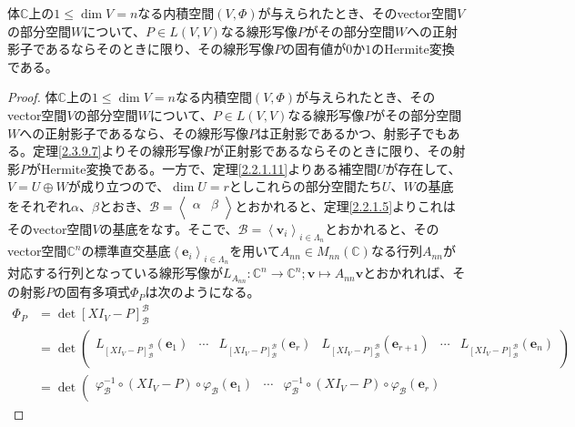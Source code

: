 \documentclass[dvipdfmx]{jsarticle}
\begin{document}
\begin{thm}\label{2.3.9.10}
体$\mathbb{C}$上の$1 \leq \dim V = n$なる内積空間$(V,\varPhi)$が与えられたとき、そのvector空間$V$の部分空間$W$について、$P \in L(V,V)$なる線形写像$P$がその部分空間$W$への正射影子であるならそのときに限り、その線形写像$P$の固有値が$0$か$1$のHermite変換である。
\end{thm}
\begin{proof}
体$\mathbb{C}$上の$1 \leq \dim V = n$なる内積空間$(V,\varPhi)$が与えられたとき、そのvector空間$V$の部分空間$W$について、$P \in L(V,V)$なる線形写像$P$がその部分空間$W$への正射影子であるなら、その線形写像$P$は正射影であるかつ、射影子でもある。定理\ref{2.3.9.7}よりその線形写像$P$が正射影であるならそのときに限り、その射影$P$がHermite変換である。一方で、定理\ref{2.2.1.11}よりある補空間$U$が存在して、$V = U \oplus W$が成り立つので、$\dim U = r$としこれらの部分空間たち$U$、$W$の基底をそれぞれ$\alpha$、$\beta$とおき、$\mathcal{B} =\left\langle \begin{matrix}
\alpha & \beta \\
\end{matrix} \right\rangle$とおかれると、定理\ref{2.2.1.5}よりこれはそのvector空間$V$の基底をなす。そこで、$\mathcal{B} =\left\langle \mathbf{v}_{i} \right\rangle_{i \in \varLambda_{n}}$とおかれると、そのvector空間$\mathbb{C}^{n}$の標準直交基底$\left\langle \mathbf{e}_{i} \right\rangle_{i \in \varLambda_{n}}$を用いて$A_{nn} \in M_{nn}\left( \mathbb{C} \right)$なる行列$A_{nn}$が対応する行列となっている線形写像が$L_{A_{nn}}:\mathbb{C}^{n} \rightarrow \mathbb{C}^{n};\mathbf{v} \mapsto A_{nn}\mathbf{v}$とおかれれば、その射影$P$の固有多項式$\varPhi_{P}$は次のようになる。
\begin{align*}
\varPhi_{P} &= \det\left[ XI_{V} - P \right]_{\mathcal{B}}^{\mathcal{B}}\\
&= \det\begin{pmatrix}
L_{\left[ XI_{V} - P \right]_{\mathcal{B}}^{\mathcal{B}}}\left( \mathbf{e}_{1} \right) & \cdots & L_{\left[ XI_{V} - P \right]_{\mathcal{B}}^{\mathcal{B}}}\left( \mathbf{e}_{r} \right) & L_{\left[ XI_{V} - P \right]_{\mathcal{B}}^{\mathcal{B}}}\left( \mathbf{e}_{r + 1} \right) & \cdots & L_{\left[ XI_{V} - P \right]_{\mathcal{B}}^{\mathcal{B}}}\left( \mathbf{e}_{n} \right) \\
\end{pmatrix}\\
&= \det\left( \begin{matrix}
\varphi_{\mathcal{B}}^{- 1} \circ \left( XI_{V} - P \right) \circ \varphi_{\mathcal{B}}\left( \mathbf{e}_{1} \right) & \cdots & \varphi_{\mathcal{B}}^{- 1} \circ \left( XI_{V} - P \right) \circ \varphi_{\mathcal{B}}\left( \mathbf{e}_{r} \right) \\

\end{matrix}
\end{align*}
\end{proof}
\end{document}
